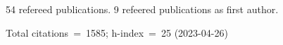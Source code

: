 54 refereed publications. 9 refeered publications as first author.

Total citations~=~1585; h-index~=~25 (2023-04-26)